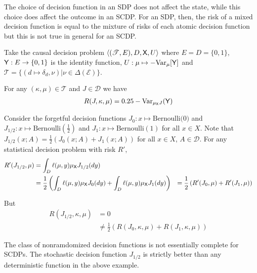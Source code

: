 \begin{example}
The choice of decision function in an SDP does not affect the state, while this choice does affect the outcome in an SCDP. For an SDP, then, the risk of a mixed decision function is equal to the mixture of risks of each atomic decision function but this is not true in general for an SCDP.

Take the causal decision problem $\langle (\mathscr{T}, E), D, \mathsf{X}, U \rangle$ where $E=D=\{0,1\}$, $\mathsf{Y}:E\to \{0,1\}$ is the identity function, $U:\mu\mapsto -\text{Var}_\mu[\mathsf{Y}]$ and $\mathscr{T}=\{(d\mapsto \delta_d,\nu)|\nu\in \Delta(\mathcal{E})\}$.

For any $(\kappa,\mu)\in \mathscr{T}$ and $J\in\mathscr{D}$ we have
\begin{align}
    R(J,\kappa,\mu) = 0.25-\text{Var}_{\mu_{\mathsf{X}} J}(\mathsf{Y})
\end{align}

Consider the forgetful decision functions $J_0:x\mapsto \text{Bernoulli(0)}$ and $J_{1/2}:x\mapsto \mathrm{Bernoulli(\tfrac{1}{2})}$ and $J_1:x\mapsto \mathrm{Bernoulli(1)}$ for all $x\in X$. Note that $J_{1/2}(x;A) = \tfrac{1}{2}(J_0(x;A)+J_1(x;A))$ for all $x\in X$, $A\in \mathcal{D}$. For any statistical decision problem with risk $R'$,
\begin{align}
    R'(J_{1/2},\mu) &= \int_D \ell(\mu,y) \mu_{\mathsf{X}} J_{1/2}(dy)\\
                    &= \frac{1}{2}\left(\int_D \ell(\mu,y) \mu_{\mathsf{X}} J_{0}(dy) + \int_D \ell(\mu,y) \mu_{\mathsf{X}} J_{1}(dy)\right)
                    &= \frac{1}{2}\left(R'(J_0,\mu) + R'(J_1,\mu) \right)
\end{align}

But
\begin{align}
    R(J_{1/2},\kappa,\mu) &= 0\\
                          &\neq \frac{1}{2}\left(R(J_0,\kappa,\mu) + R(J_1,\kappa,\mu)\right)
\end{align}

\end{example}

\begin{corollary}
The class of nonramdomized decision functions is not essentially complete for SCDPs. The stochastic decision function $J_{1/2}$ is strictly better than any deterministic function in the above example.
\end{corollary}

